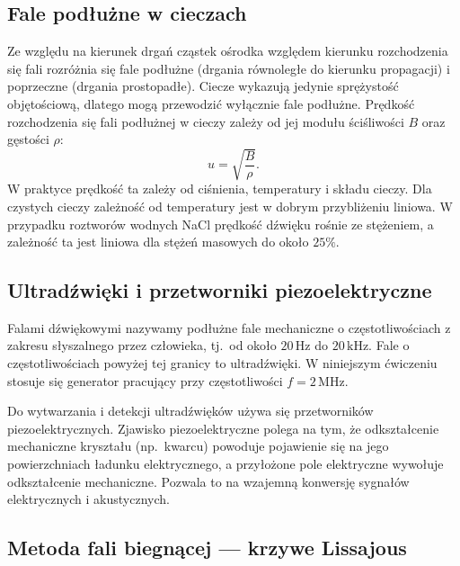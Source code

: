 \documentclass[12pt, a4paper]{article}
\begin{document}
\subsection{Fale podłużne w cieczach}

Ze względu na kierunek drgań cząstek ośrodka względem kierunku rozchodzenia się fali rozróżnia się fale podłużne (drgania równoległe do kierunku propagacji) i poprzeczne (drgania prostopadłe). Ciecze wykazują jedynie sprężystość objętościową, dlatego mogą przewodzić wyłącznie fale podłużne. Prędkość rozchodzenia się fali podłużnej w cieczy zależy od jej modułu ściśliwości $B$ oraz gęstości $\rho$:
\begin{equation}
    u = \sqrt{\frac{B}{\rho}}.
    \label{eq:elastic}
\end{equation}
W praktyce prędkość ta zależy od ciśnienia, temperatury i składu cieczy. Dla czystych cieczy zależność od temperatury jest w dobrym przybliżeniu liniowa. W przypadku roztworów wodnych NaCl prędkość dźwięku rośnie ze stężeniem, a zależność ta jest liniowa dla stężeń masowych do około $25\%$.

\subsection{Ultradźwięki i przetworniki piezoelektryczne}

Falami dźwiękowymi nazywamy podłużne fale mechaniczne o częstotliwościach z zakresu słyszalnego przez człowieka, tj.\ od około $20\,\mathrm{Hz}$ do $20\,\mathrm{kHz}$. Fale o częstotliwościach powyżej tej granicy to ultradźwięki. W niniejszym ćwiczeniu stosuje się generator pracujący przy częstotliwości $f = 2\,\mathrm{MHz}$.

Do wytwarzania i detekcji ultradźwięków używa się przetworników piezoelektrycznych. Zjawisko piezoelektryczne polega na tym, że odkształcenie mechaniczne kryształu (np.\ kwarcu) powoduje pojawienie się na jego powierzchniach ładunku elektrycznego, a przyłożone pole elektryczne wywołuje odkształcenie mechaniczne. Pozwala to na wzajemną konwersję sygnałów elektrycznych i akustycznych.

\subsection{Metoda fali biegnącej --- krzywe Lissajous}
\end{document}
